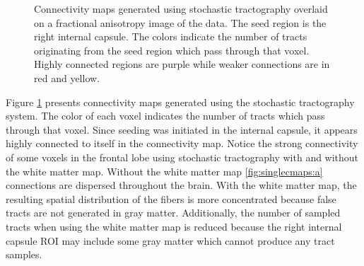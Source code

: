 \begin{figure}
  \center
	\caption{Connectivity maps generated using stochastic tractography overlaid on a fractional anisotropy image of the data.  The seed region is the right internal capsule.  The colors indicate the number of tracts originating from the seed region which pass through that voxel.  Highly connected regions are purple while weaker connections are in red and yellow.}
  \label{fig:singlecmaps}
\end{figure}

Figure \ref{fig:singlecmaps} presents connectivity maps generated using the stochastic tractography system.  The color of each voxel indicates the number of tracts which pass through that voxel.  Since seeding was initiated in the internal capsule, it appears highly connected to itself in the connectivity map.  Notice the strong connectivity of some voxels in the frontal lobe using stochastic tractography with and without the white matter map.  Without the white matter map \ref{fig:singlecmaps:a} connections are dispersed throughout the brain.  With the white matter map, the resulting spatial distribution of the fibers is more concentrated because false tracts are not generated in gray matter.  Additionally, the number of sampled tracts when using the white matter map is reduced because the right internal capsule ROI may include some gray matter which cannot produce any tract samples.

